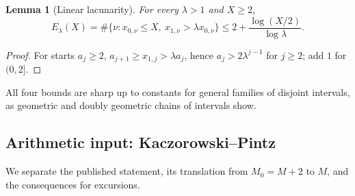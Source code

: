 \documentclass[11pt,reqno]{amsart}
\numberwithin{equation}{section}
\theoremstyle{plain}
\newtheorem{lemma}[theorem]{Lemma}
\theoremstyle{definition}
\theoremstyle{remark}
\begin{document}
\begin{lemma}[Linear lacunarity]
\label{lem:linear-lacunary}
For every $\lambda>1$ and $X\ge2$,
\begin{equation}
\label{eq:linear-lacunary-count}
E_\lambda(X)=\#\{\nu:x_{0,\nu}\le X,\ x_{1,\nu}>\lambda x_{0,\nu}\}
\le2+\frac{\log(X/2)}{\log\lambda}.
\end{equation}
\end{lemma}

\begin{proof}
For starts $a_j\ge2$, $a_{j+1}\ge x_{1,j}>\lambda a_j$, hence
$a_j>2\lambda^{j-1}$ for $j\ge2$; add $1$ for $(0,2]$.
\end{proof}

All four bounds are sharp up to constants for general families of disjoint
intervals, as geometric and doubly geometric chains of intervals show.

\subsection{Arithmetic input: Kaczorowski--Pintz}

We separate the published statement, its translation from $M_0=M+2$ to
$M$, and the consequences for excursions.
\end{document}

